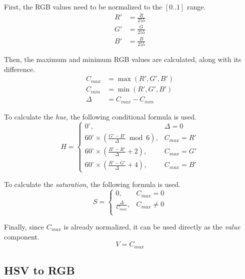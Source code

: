 \documentclass{amsart}
\begin{document}
First, the RGB values need to be normalized to the $[0..1]$ range.
\begin{align*}
  R' &= \frac{R}{255} \\
  G' &= \frac{G}{255} \\
  B' &= \frac{B}{255}
\end{align*}

Then, the maximum and minimum RGB values are calculated, along with its
difference.
\begin{align*}
  C_{max} &= \max(R', G', B') \\
  C_{min} &= \min(R', G', B') \\
  \Delta  &= C_{max} - C_{min}
\end{align*}

To calculate the \textit{hue}, the following conditional formula is used.
\begin{displaymath}
  H =
  \begin{cases}
    0^\circ,                                                    & \Delta = 0 \\
    60^\circ \times \left(\frac{G'-B'}{\Delta} \bmod 6 \right), & C_{max} = R' \\
    60^\circ \times \left(\frac{B'-R'}{\Delta} + 2 \right),     & C_{max} = G' \\
    60^\circ \times \left(\frac{R'-G'}{\Delta} + 4 \right),     & C_{max} = B'
  \end{cases}
\end{displaymath}

To calculate the \textit{saturation}, the following formula is used.
\begin{displaymath}
  S =
  \begin{cases}
    0,                      & C_{max} = 0 \\
    \frac{\Delta}{C_{max}}, & C_{max} \neq 0 \\
  \end{cases}
\end{displaymath}

Finally, since $C_{max}$ is already normalized, it can be used directly as the
\textit{value} component.
\begin{displaymath}
  V = C_{max}
\end{displaymath}

\subsection{HSV to RGB}
\end{document}
